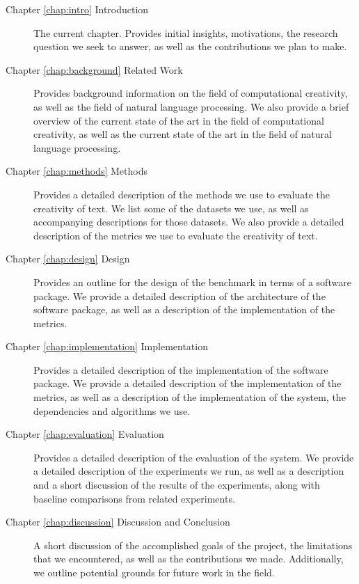 \begin{description}
    \item[Chapter \ref{chap:intro} Introduction] The current chapter. Provides initial insights, motivations, the research question we seek to answer, as well as the contributions we plan to make. 
    \item[Chapter \ref{chap:background} Related Work] Provides background information on the field of computational creativity, as well as the field of natural language processing. We also provide a brief overview of the current state of the art in the field of computational creativity, as well as the current state of the art in the field of natural language processing. 
    \item[Chapter \ref{chap:methods} Methods] Provides a detailed description of the methods we use to evaluate the creativity of text. We list some of the datasets we use, as well as accompanying descriptions for those datasets. We also provide a detailed description of the metrics we use to evaluate the creativity of text.
    \item[Chapter \ref{chap:design} Design] Provides an outline for the design of the benchmark in terms of a software package. We provide a detailed description of the architecture of the software package, as well as a description of the implementation of the metrics.  
    \item[Chapter \ref{chap:implementation} Implementation] Provides a detailed description of the implementation of the software package. We provide a detailed description of the implementation of the metrics, as well as a description of the implementation of the system, the dependencies and algorithms we use.
    \item[Chapter \ref{chap:evaluation} Evaluation] Provides a detailed description of the evaluation of the system. We provide a detailed description of the experiments we run, as well as a description and a short discussion of the results of the experiments, along with baseline comparisons from related experiments.
    \item[Chapter \ref{chap:discussion} Discussion and Conclusion] A short discussion of the accomplished goals of the project, the limitations that we encountered, as well as the contributions we made. Additionally, we outline potential grounds for future work in the field.  
\end{description}
